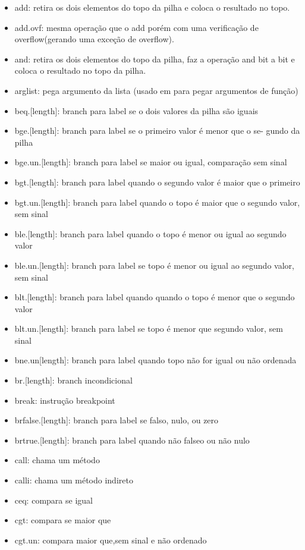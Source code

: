 \documentclass{article}
\begin{document}
\begin{itemize}
\item add: retira os dois elementos do topo da pilha e coloca o resultado no
topo.
\item add.ovf: mesma operação que o add porém com uma verificação de
overflow(gerando uma exceção de overflow).
\item and: retira os dois elementos do topo da pilha, faz a operação and bit
a bit e coloca o resultado no topo da pilha.
\item arglist: pega argumento da lista (usado em para pegar argumentos de
função)
\item beq.[length]: branch para label se o dois valores da pilha são iguais
\item bge.[length]: branch para label se o primeiro valor é menor que o se-
gundo da pilha
\item bge.un.[length]: branch para label se maior ou igual, comparação sem
sinal
\item bgt.[length]: branch para label quando o segundo valor é maior que o
primeiro
\item bgt.un.[length]: branch para label quando o topo é maior que o segundo
valor, sem sinal
\item ble.[length]: branch para label quando o topo é menor ou igual ao
segundo valor
\item ble.un.[length]: branch para label se topo é menor ou igual ao segundo
valor, sem sinal
\item blt.[length]: branch para label quando quando o topo é menor que o
segundo valor
\item blt.un.[length]: branch para label se topo é menor que segundo valor,
sem sinal
\item bne.un[length]: branch para label quando topo não for igual ou não
ordenada
\item br.[length]: branch incondicional
\item break: instrução breakpoint
\item brfalse.[length]: branch para label se falso, nulo, ou zero
\item brtrue.[length]: branch para label quando não falseo ou não nulo
\item call: chama um método
\item calli: chama um método indireto
\item ceq: compara se igual
\item cgt: compara se maior que
\item cgt.un: compara maior que,sem sinal e não ordenado

\end{itemize}
\end{document}
